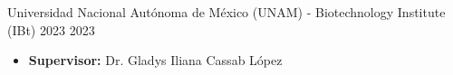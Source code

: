 \documentclass{simplecv}
\begin{document}

    {Universidad Nacional Autónoma de México (UNAM) - Biotechnology Institute (IBt)} %
    {} %
    {2023} %
    {2023} %
    {

        \vspace{-11pt}
        \begin{itemize}[leftmargin=*]
        \setlength{\itemsep}{0cm}
          \item \textbf{Supervisor:} Dr. Gladys Iliana Cassab López
        \end{itemize}

    } %
    



\end{document}
